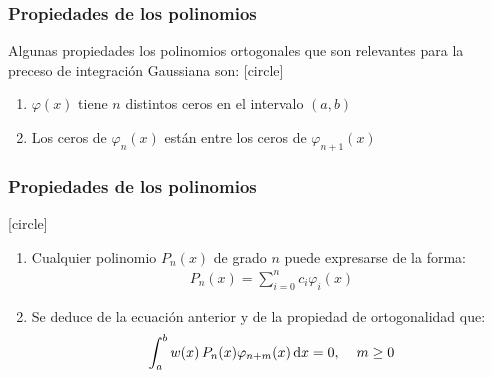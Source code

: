 \begin{frame}
\frametitle{Propiedades de los polinomios}
Algunas propiedades los polinomios ortogonales que son relevantes para la preceso de integración Gaussiana son:
[circle]
\begin{enumerate}[<+->]
\item $\varphi(x)$ tiene $n$ distintos ceros en el intervalo $(a, b)$
\item Los ceros de $\varphi_{n}(x)$ están entre los ceros de $\varphi_{n+1}(x)$
\seti
\end{enumerate}
\end{frame}
\begin{frame}
\frametitle{Propiedades de los polinomios}
[circle]
\begin{enumerate}
\conti
\item Cualquier polinomio $P_{n}(x)$ de grado $n$ puede expresarse de la forma:
\begin{align*}
P_{n}(x) =  \sum_{i=0}^{n} c_{i} \varphi_{i} (x)
\end{align*}
\item Se deduce de la ecuación anterior y de la propiedad de ortogonalidad que:
\begin{align*}
\int_{a}^{b} w(x) \, P_{n}(x) \varphi_{n + m} (x) \dd{x} = 0, \hspace{0.4cm} m \geq 0
\end{align*}
\end{enumerate}
\end{frame}

